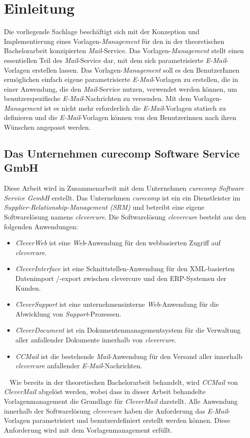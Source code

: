 \chapter{Einleitung}
\label{cha:Einleitung}
Die vorliegende Sachlage beschäftigt sich mit der Konzeption und Implementierung eines Vorlagen-\emph{Management} für den in der theoretischen Bachelorarbeit konzipierten \emph{Mail}-Service. Das Vorlagen-\emph{Management} stellt einen essentiellen Teil des \emph{Mail}-Service dar, mit dem sich parametrisierte \emph{E-Mail}-Vorlagen erstellen lassen. Das Vorlagen-\emph{Management} soll es den BenutzerInnen ermöglichen einfach eigene parametrisierte \emph{E-Mail}-Vorlagen zu erstellen, die in einer Anwendung, die den \emph{Mail}-Service nutzen, verwendet werden können, um benutzerspezifische \emph{E-Mail}-Nachrichten zu versenden. Mit dem Vorlagen-\emph{Management} ist es nicht mehr erforderlich die \emph{E-Mail}-Vorlagen statisch zu definieren und die \emph{E-Mail}-Vorlagen können von den Benutzerinnen nach ihren Wünschen angepasst werden.  

\section{Das Unternehmen curecomp Software Service GmbH}
Diese Arbeit wird in Zusammenarbeit mit dem Unternehmen \emph{curecomp Software Service GembH} erstellt. Das Unternehmen \emph{curecomp} ist ein ein Dienstleister im \emph{Supplier-Relationship-Management (SRM)} und betreibt eine eigene Softwarelösung namens \emph{clevercure}. Die Softwarelösung \emph{clevercure} besteht aus den folgenden Anwendungen:
\begin{itemize}
	\item\emph{CleverWeb} ist eine \emph{Web}-Anwendung für den webbasierten Zugriff auf \emph{clevercure}.
	\item\emph{CleverInterface} ist eine Schnittstellen-Anwendung für den XML-basierten Datenimport /-export zwischen clevercure und den ERP-Systemen der Kunden.
	\item\emph{CleverSupport} ist eine unternehmensinterne \emph{Web}-Anwendung für die Abwicklung von \emph{Support}-Prozessen.
	\item\emph{CleverDocument} ist ein Dokumentenmanagementsystem für die Verwaltung aller anfallender Dokumente innerhalb von \emph{clevercure}.
	\item\emph{CCMail} ist die bestehende \emph{Mail}-Anwendung für den Versand aller innerhalb \emph{clevercure} anfallender \emph{E-Mail}-Nachrichten.
\end{itemize}
\ \newline
Wie bereits in der theoretischen Bachelorarbeit behandelt, wird \emph{CCMail} von \emph{CleverMail} abgelöst werden, wobei dass in dieser Arbeit behandelte Vorlagenmanagement die Grundlage für \emph{CleverMail} darstellt. Alle Anwendung innerhalb der Softwarelösung \emph{clevercure} haben die Anforderung das \emph{E-Mail}-Vorlagen parametrisiert und benutzerdefiniert erstellt werden können. Diese Anforderung wird mit dem Vorlagenmanagement erfüllt.

